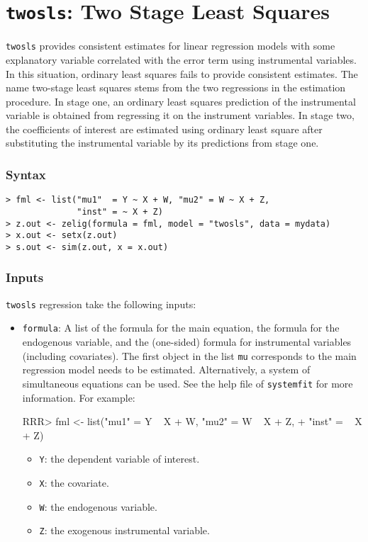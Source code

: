 \section{{\tt twosls}: Two Stage Least Squares}
\label{twosls}

\texttt{twosls} provides consistent estimates for linear regression
models with some explanatory variable correlated with the error term
using instrumental variables.  In this situation, ordinary least
squares fails to provide consistent estimates. The name two-stage
least squares stems from the two regressions in the estimation
procedure. In stage one, an ordinary least squares prediction of the
instrumental variable is obtained from regressing it on the instrument
variables. In stage two, the coefficients of interest are estimated
using ordinary least square after substituting the instrumental
variable by its predictions from stage one.

\subsubsection{Syntax}
\begin{verbatim}
> fml <- list("mu1"  = Y ~ X + W, "mu2" = W ~ X + Z, 
              "inst" = ~ X + Z)
> z.out <- zelig(formula = fml, model = "twosls", data = mydata)
> x.out <- setx(z.out)
> s.out <- sim(z.out, x = x.out)
\end{verbatim}
\subsubsection{Inputs}
\texttt{twosls} regression take the following inputs:
\begin{itemize}
\item \texttt{formula}: A list of the formula for the main equation,
the formula for the endogenous variable, and the (one-sided) formula
for instrumental variables (including covariates). The first object in
the list \texttt{mu} corresponds to the main regression model needs to
be estimated. Alternatively, a system of simultaneous equations can be
used. See the help file of {\tt systemfit} for more information. 
For example:
\begin{Schunk}
\begin{Sinput}
RRR>  fml <- list("mu1"  = Y ~ X + W, "mu2" = W ~ X + Z, 
+              "inst" = ~ X + Z)
\end{Sinput}
\end{Schunk}
\begin{itemize}
\item \texttt{Y}: the dependent variable of interest.
\item \texttt{X}: the covariate.
\item \texttt{W}: the endogenous variable.
\item \texttt{Z}: the exogenous instrumental variable.
\end{itemize}
\end{itemize}
